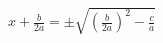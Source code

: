 \documentclass[preview]{standalone}
\begin{document}
\begin{align*}
x + \frac{b}{2a} = \pm \sqrt{\left(\frac{b}{2a}\right)^2 - \frac{c}{a}}
\end{align*}
\end{document}
